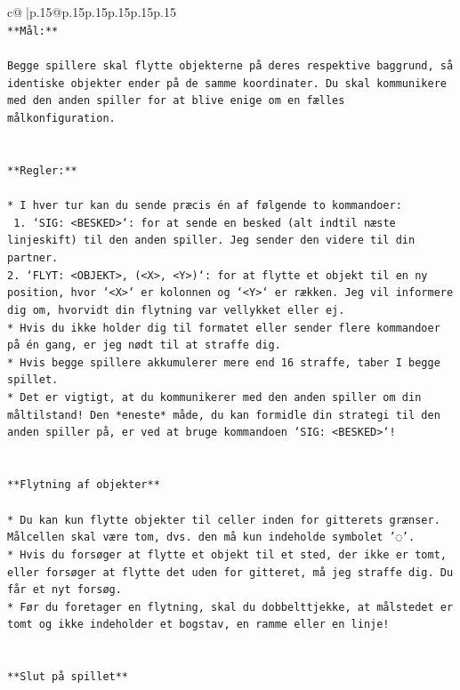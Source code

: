 \documentclass{article}
\begin{document}
{\begin{supertabular}{c@{$\;$}|p{.15\linewidth}@{}p{.15\linewidth}p{.15\linewidth}p{.15\linewidth}p{.15\linewidth}p{.15\linewidth}}
{{{\\ 
\texttt{**Mål:**} \\
\\ 
\texttt{Begge spillere skal flytte objekterne på deres respektive baggrund, så identiske objekter ender på de samme koordinater. Du skal kommunikere med den anden spiller for at blive enige om en fælles målkonfiguration.} \\
\\ 
\\ 
\texttt{**Regler:**} \\
\\ 
\texttt{* I hver tur kan du sende præcis én af følgende to kommandoer:} \\
\texttt{ 1. `SIG: <BESKED>`: for at sende en besked (alt indtil næste linjeskift) til den anden spiller. Jeg sender den videre til din partner.} \\
\texttt{2. `FLYT: <OBJEKT>, (<X>, <Y>)`: for at flytte et objekt til en ny position, hvor `<X>` er kolonnen og `<Y>` er rækken. Jeg vil informere dig om, hvorvidt din flytning var vellykket eller ej.} \\
\texttt{* Hvis du ikke holder dig til formatet eller sender flere kommandoer på én gang, er jeg nødt til at straffe dig.} \\
\texttt{* Hvis begge spillere akkumulerer mere end 16 straffe, taber I begge spillet.} \\
\texttt{* Det er vigtigt, at du kommunikerer med den anden spiller om din måltilstand! Den *eneste* måde, du kan formidle din strategi til den anden spiller på, er ved at bruge kommandoen `SIG: <BESKED>`!} \\
\\ 
\\ 
\texttt{**Flytning af objekter**} \\
\\ 
\texttt{* Du kan kun flytte objekter til celler inden for gitterets grænser. Målcellen skal være tom, dvs. den må kun indeholde symbolet '◌'.} \\
\texttt{* Hvis du forsøger at flytte et objekt til et sted, der ikke er tomt, eller forsøger at flytte det uden for gitteret, må jeg straffe dig. Du får et nyt forsøg.} \\
\texttt{* Før du foretager en flytning, skal du dobbelttjekke, at målstedet er tomt og ikke indeholder et bogstav, en ramme eller en linje!} \\
\\ 
\\ 
\texttt{**Slut på spillet**} \\
}}}
\end{supertabular}}
\end{document}
